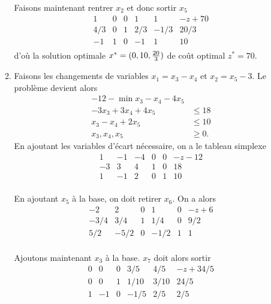 \begin{enumerate}
\begin{solution}
\begin{enumerate}
          Faisons maintenant rentrer $x_2$ et donc sortir $x_5$
          \[
            \begin{array}{ccccc|l}
               1   & 0 & 0 &  1   &  1   & -z+70\\
              \hline
               4/3 & 0 & 1 &  2/3 & -1/3 & 20/3\\
              -1   & 1 & 0 & -1   &  1   & 10\\
            \end{array}
          \]
          d'où la solution optimale $x^* = (0,10,\frac{20}{3})$
          de coût optimal $z^* = 70$.
        \item
          Faisons les changements de variables $x_1 = x_3 - x_4$ et
          $x_2 = x_5-3$.
          Le problème devient alors
          \begin{align*}
            -12 - \min x_3 - x_4 - 4x_5\\
            -3x_3 + 3x_4 + 4x_5 & \leq 18\\
            x_3 - x_4 + 2x_5 & \leq 10\\
            x_3,x_4,x_5 & \geq 0.
          \end{align*}
          En ajoutant les variables d'écart nécessaire,
          on a le tableau simplexe
          \[
            \begin{array}{ccccc|l}
              1 & -1 & -4 & 0 & 0 & -z-12\\
              \hline
              -3 & 3 & 4 & 1 & 0 & 18\\
              1 & -1 & 2 & 0 & 1 & 10\\
            \end{array}
          \]

          En ajoutant $x_5$ à la base, on doit retirer $x_6$.
          On a alors
          \[
            \begin{array}{ccccc|l}
              -2 & 2 & 0 & 1 & 0 & -z+6\\
              \hline
              -3/4 & 3/4 & 1 & 1/4 & 0 & 9/2\\
              5/2 & -5/2 & 0 & -1/2 & 1 & 1\\
            \end{array}
          \]

          Ajoutons maintenant $x_3$ à la base. $x_7$ doit alors sortir
          \[
            \begin{array}{ccccc|l}
              0 &  0 & 0 &  3/5  & 4/5  & -z+34/5\\
              \hline
              0 &  0 & 1 &  1/10 & 3/10 & 24/5\\
              1 & -1 & 0 & -1/5  & 2/5  & 2/5\\
            \end{array}
          \]


\end{enumerate}
\end{solution}
\end{enumerate}
